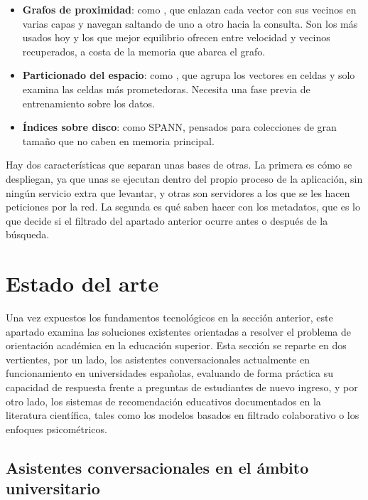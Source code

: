 \begin{itemize}
  \item \textbf{Grafos de proximidad}: como \cite{malkov2020hnsw}, que enlazan cada vector con sus vecinos en varias capas y navegan saltando de uno a otro hacia la consulta. Son los más usados hoy y los que mejor equilibrio ofrecen entre velocidad y vecinos recuperados, a costa de la memoria que abarca el grafo.
  \item \textbf{Particionado del espacio}: como \cite{jegou2011ivfpq}, que agrupa los vectores en celdas y solo examina las celdas más prometedoras. Necesita una fase previa de entrenamiento sobre los datos.
  \item \textbf{Índices sobre disco}: como SPANN\cite{chen2021spann}, pensados para colecciones de gran tamaño que no caben en memoria principal.
\end{itemize}

Hay dos características que separan unas bases de otras. La primera es cómo se despliegan, ya que unas se ejecutan dentro del propio proceso de la aplicación, sin ningún servicio extra que levantar, y otras son servidores a los que se les hacen peticiones por la red. La segunda es qué saben hacer con los metadatos, que es lo que decide si el filtrado del apartado anterior ocurre antes o después de la búsqueda.


\section[Estado del arte]{Estado del arte}
\label{secc:estado_arte_asistentes}

Una vez expuestos los fundamentos tecnológicos en la sección anterior, este apartado examina las soluciones existentes orientadas a resolver el problema de orientación académica en la educación superior. Esta sección se reparte en dos vertientes, por un lado, los asistentes conversacionales actualmente en funcionamiento en universidades españolas, evaluando de forma práctica su capacidad de respuesta frente a preguntas de estudiantes de nuevo ingreso, y por otro lado, los sistemas de recomendación educativos documentados en la literatura científica, tales como los modelos basados en filtrado colaborativo o los enfoques psicométricos.

\subsection{Asistentes conversacionales en el ámbito universitario}


